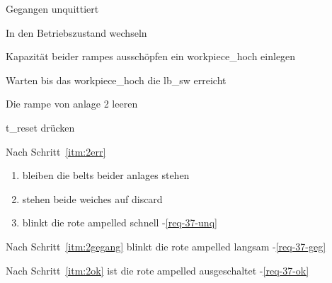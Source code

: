 \begin{ablauf}{Gegangen unquittiert}
    \item In den Betriebszustand wechseln
    \item Kapazität beider \glspl{rampe} ausschöpfen ein \gls{workpiece_hoch} einlegen
    \item \label{itm:2err} Warten bis das \gls{workpiece_hoch} die \gls{lb_sw} erreicht
    \item\label{itm:2gegang} Die \gls{rampe} von \gls{anlage} 2 leeren
    \item\label{itm:2ok} \gls{t_reset} drücken
\end{ablauf}
\begin{erwartung}
    \item Nach Schritt~\ref{itm:2err}
    \begin{enumerate}
        \item bleiben die \glspl{belt} beider \glspl{anlage} stehen 
        \item stehen beide \glspl{weiche} auf \gls{discard} 
        \item blinkt die rote \gls{ampelled} schnell -\ref{req-37-unq}
    \end{enumerate}
    \item Nach Schritt~\ref{itm:2gegang} blinkt die rote \gls{ampelled} langsam -\ref{req-37-geg}
    \item Nach Schritt~\ref{itm:2ok} ist die rote \gls{ampelled} ausgeschaltet -\ref{req-37-ok}
\end{erwartung}

